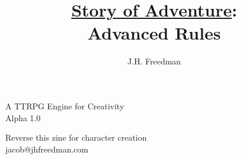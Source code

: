 \documentclass[statementpaper,oneside,article,14pt]{memoir}
\newcommand{\BackgroundPic}[1]{%
	\put(0,0){%
		\parbox[b][\paperheight]{\paperwidth}{%
			\vfill
			\centering
			{\transparent{0.4} \texttt{[image: \#1]}}%
			\vfill
}}}
\begin{document}
	
	
	\title{\underline{Story of Adventure}:\\Advanced Rules}
	\author{J.H. Freedman}
	\date{}
	
	\begingroup
	\let\cleardoublepage\clearpage
	
	
	\begin{titlingpage}
		\maketitle
		
		A TTRPG Engine for Creativity\\Alpha 1.0
		
	\end{titlingpage}
	
	\endgroup
	
	\pagestyle{empty}
	
	
	
	
	
	
	
	\newpage
	
	Reverse this zine for character creation
	\\jacob@jhfreedman.com
	
\end{document}
